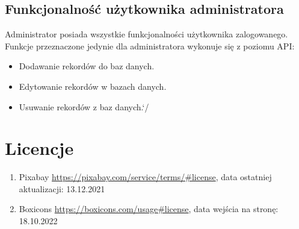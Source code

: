 \documentclass[12pt]{article}
\begin{document}
\begin{flushleft}
		\subsection{Funkcjonalność użytkownika administratora}	
		Administrator posiada wszystkie funkcjonalności użytkownika zalogowanego. Funkcje przeznaczone jedynie dla administratora wykonuje się z poziomu API:
		\begin{itemize}
			\item Dodawanie rekordów do baz danych.
			\item Edytowanie rekordów w bazach danych. 
			\item Usuwanie rekordów z baz danych.`/
		\end{itemize}
	
	
	


	
	
			
	\pagebreak
	\section{Licencje}
		\begin{enumerate}
			\item	Pixabay
			\url{https://pixabay.com/service/terms/#license}, 
			data ostatniej aktualizacji: 13.12.2021
			
			
			\item	Boxicons
			\url{https://boxicons.com/usage#license}, 
			data wejścia na stronę: 18.10.2022
		\end{enumerate}
	
	
	
%	
%	
	
\end{flushleft}
\end{document}
